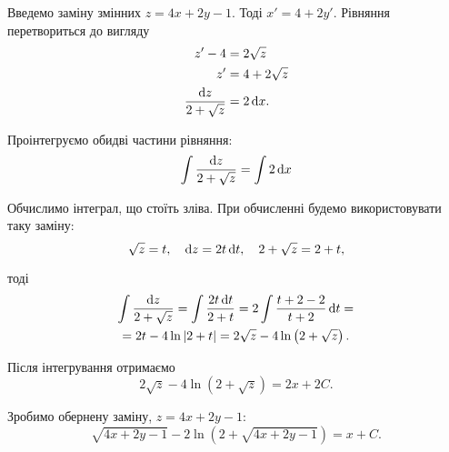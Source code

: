 \begin{solution}
	Введемо заміну змінних $z = 4 x + 2 y - 1$. Тоді $x' = 4 + 2 y'$. Рівняння перетвориться до вигляду 
	\begin{align*} 
		z' - 4 &= 2 \sqrt{z} \\ 
		z' &= 4 + 2 \sqrt{z} \\ 
		\frac{\mathop{}\!\mathrm{d} z}{2 + \sqrt{z}} &= 2 \mathop{}\!\mathrm{d} x.
	\end{align*}

	Проінтегруємо обидві частини рівняння: \[ \int \frac{\mathop{}\!\mathrm{d} z}{2 + \sqrt{z}} = \int 2 \mathop{}\!\mathrm{d} x \] 

	Обчислимо інтеграл, що стоїть зліва. При обчисленні будемо використовувати таку заміну: \[ \sqrt{z} = t, \quad \mathop{}\!\mathrm{d} z = 2 t \mathop{}\!\mathrm{d} t, \quad 2 + \sqrt{z} = 2 + t, \] 
	
	тоді
	\begin{multline*}
		\int \frac{\mathop{}\!\mathrm{d} z}{2 + \sqrt{z}} = \int \frac{2 t \mathop{}\!\mathrm{d} t}{2 + t} = 2 \int \frac{t + 2 - 2}{t + 2} \mathop{}\!\mathrm{d} t = \\
		= 2 t - 4 \ln |2 + t| = 2 \sqrt{z} - 4 \ln \left(2 + \sqrt{z}\right).
	\end{multline*}

	Після інтегрування отримаємо \[2 \sqrt{z} - 4 \ln \left(2 + \sqrt{z}\right) = 2 x + 2 C.\]

	Зробимо обернену заміну, $z = 4 x + 2 y - 1$: \[ \sqrt{4 x + 2 y - 1} - 2 \ln \left(2 + \sqrt{4 x + 2 y - 1}\right) = x + C.\]
\end{solution}

